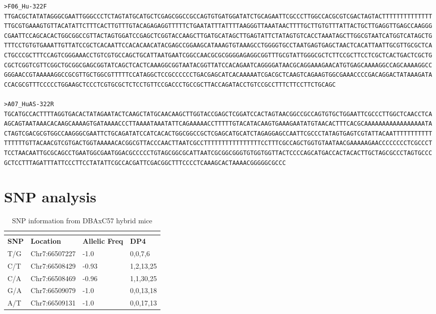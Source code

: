 \begin{verbatim}
>F06_Hu-322F
TTGACGCTATATAGGGCGAATTGGGCCCTCTAGTATGCATGCTCGAGCGGCCGCCAGTGTGATGGATATCTGCAGAATTCGCCCTTGGCCACGCGTCGACTAGTACTTTTTTTTTTTTTT
TTGCGTGAAAGTGTTACATATTCTTTCACTTGTTTGTACAGAGAGGTTTTTCTGAATATTTATTTTAAGGGTTAAATAACTTTTGCTTGTGTTTATTACTGCTTGAGGTTGAGCCAAGGG
CGAATTCCAGCACACTGGCGGCCGTTACTAGTGGATCCGAGCTCGGTACCAAGCTTGATGCATAGCTTGAGTATTCTATAGTGTCACCTAAATAGCTTGGCGTAATCATGGTCATAGCTG
TTTCCTGTGTGAAATTGTTATCCGCTCACAATTCCACACAACATACGAGCCGGAAGCATAAAGTGTAAAGCCTGGGGTGCCTAATGAGTGAGCTAACTCACATTAATTGCGTTGCGCTCA
CTGCCCGCTTTCCAGTCGGGAAACCTGTCGTGCCAGCTGCATTAATGAATCGGCCAACGCGCGGGGAGAGGCGGTTTGCGTATTGGGCGCTCTTCCGCTTCCTCGCTCACTGACTCGCTG
CGCTCGGTCGTTCGGCTGCGGCGAGCGGTATCAGCTCACTCAAAGGCGGTAATACGGTTATCCACAGAATCAGGGGATAACGCAGGAAAGAACATGTGAGCAAAAGGCCAGCAAAAGGCC
GGGAACCGTAAAAAGGCCGCGTTGCTGGCGTTTTTCCATAGGCTCCGCCCCCCTGACGAGCATCACAAAAATCGACGCTCAAGTCAGAAGTGGCGAAACCCCGACAGGACTATAAAGATA
CCACGCGTTTCCCCCTGGAAGCTCCCTCGTGCGCTCTCCTGTTCCGACCCTGCCGCTTACCAGATACCTGTCCGCCTTTCTTCCTTCTGCAGC

>A07_HuAS-322R
TGCATGCCACTTTTAGGTGACACTATAGAATACTCAAGCTATGCAACAAGCTTGGTACCGAGCTCGGATCCACTAGTAACGGCCGCCAGTGTGCTGGAATTCGCCCTTGGCTCAACCTCA
AGCAGTAATAAACACAAGCAAAAGTGATAAAACCCTTAAAATAAATATTCAGAAAAACCTTTTTGTACATACAAGTGAAAGAATATGTAACACTTTCACGCAAAAAAAAAAAAAAAAATA
CTAGTCGACGCGTGGCCAAGGGCGAATTCTGCAGATATCCATCACACTGGCGGCCGCTCGAGCATGCATCTAGAGGAGCCAATTCGCCCTATAGTGAGTCGTATTACAATTTTTTTTTTT
TTTTTTGTTACAACGTCGTGACTGGTAAAAACACGGCGTTACCCAACTTAATCGCCTTTTTTTTTTTTTTTTCCTTTCGCCAGCTGGTGTAATAACGAAAAAGAACCCCCCCCTCGCCCT
TCCTAACAATTGCGCAGCCTGAATGGCGAATGGACGCCCCCTGTAGCGGCGCATTAATCGCGGCGGGTGTGGTGGTTACTCCCCAGCATGACCACTACACTTGCTAGCGCCCTAGTGCCC
GCTCCTTTAGATTTATTCCCTTCCTATATTCGCCACGATTCGACGGCTTTCCCCTCAAAGCACTAAAACGGGGGCGCCC
\end{verbatim}
\endgroup
\pagebreak
\section{SNP analysis}
\begin{longtabu} {X[0.75,c]X[1.5,c]X[1,c]X[1.5,c]}
  \caption{SNP information from DBAxC57 hybrid mice}\\
  \label{snp table1}\\
  \toprule
  \textbf{SNP} & \textbf{Location} & \textbf{Allelic Freq} & \textbf{DP4}\footnotemark\\
  \midrule
  \endhead
  T/G & Chr7:66507227 & -1.0  & 0,0,7,6\\
  C/T & Chr7:66508429 & -0.93 & 1,2,13,25\\
  C/A & Chr7:66508469 & -0.96 & 1,1,30,25\\
  G/A & Chr7:66509079 & -1.0  & 0,0,13,18\\
  A/T & Chr7:66509131 & -1.0  & 0,0,17,13\\
  \bottomrule
\end{longtabu}
\pagebreak

